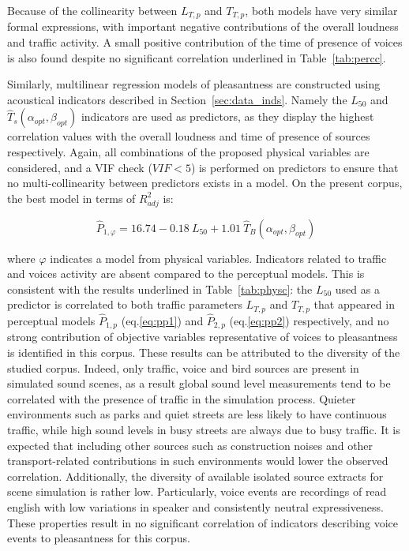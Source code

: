 \documentclass[twocolumn]{article}
\begin{document}
Because of the collinearity between $L_{T, p}$ and $T_{T, p}$, both models have very similar formal expressions, with important negative contributions of the overall loudness and traffic activity. A small positive contribution of the time of presence of voices is also found despite no significant correlation underlined in Table~\ref{tab:percc}.

Similarly, multilinear regression models of pleasantness are constructed using acoustical indicators described in Section~\ref{sec:data_inds}. Namely the $L_{50}$ and $\hat T_s(\alpha_{opt}, \beta_{opt})$ indicators are used as predictors, as they display the highest correlation values with the overall loudness and time of presence of sources respectively. Again, all combinations of the proposed physical variables are considered, and a VIF check ($VIF<5$) is performed on predictors to ensure that no multi-collinearity between predictors exists in a model. On the present corpus, the best model in terms of $R^2_{adj}$ is:

\begin{equation}
\hat P_{1, \varphi} = 16.74 - 0.18~L_{50} + 1.01~\hat T_B(\alpha_{opt}, \beta_{opt}) \label{eq:pphi}
\end{equation}

where $\varphi$ indicates a model from physical variables. Indicators related to traffic and voices activity are absent compared to the perceptual models. This is consistent with the results underlined in Table~\ref{tab:physc}: the $L_{50}$ used as a predictor is correlated to both traffic parameters $L_{T, p}$ and $T_{T, p}$ that appeared in perceptual models $\hat P_{1, p}$ (eq.\ref{eq:pp1}) and $\hat P_{2, p}$ (eq.\ref{eq:pp2}) respectively, and no strong contribution of objective variables representative of voices to pleasantness is identified in this corpus. These results can be attributed to the diversity of the studied corpus. Indeed, only traffic, voice and bird sources are present in simulated sound scenes, as a result global sound level measurements tend to be correlated with the presence of traffic in the simulation process. Quieter environments such as parks and quiet streets are less likely to have continuous traffic, while high sound levels in busy streets are always due to busy traffic. It is expected that including other sources such as construction noises and other transport-related contributions in such environments would lower the observed correlation. Additionally, the diversity of available isolated source extracts for scene simulation is rather low. Particularly, voice events are recordings of read english with low variations in speaker and consistently neutral expressiveness. These properties result in no significant correlation of indicators describing voice events to pleasantness for this corpus.
\end{document}
